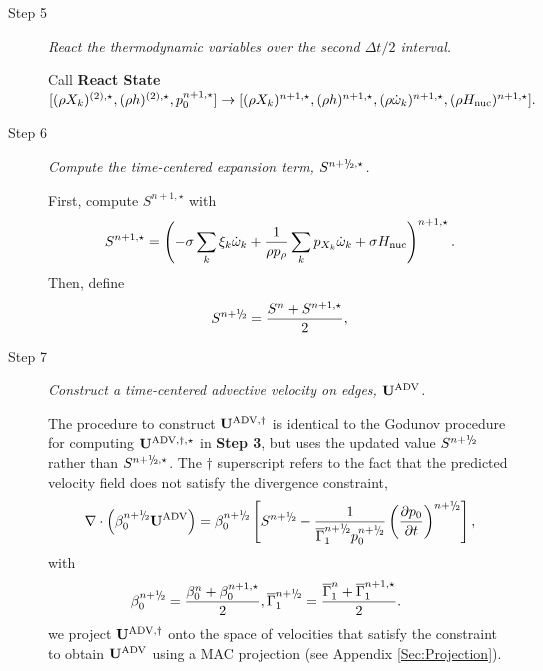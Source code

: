 \begin{description}
\item[Step 5] {\em React the thermodynamic variables over the second $\Delta t / 2$ interval.}

Call {\bf React State}$[ (\rho X_k)^{(2),\star}, (\rho h)^{(2),\star}, p_0^{n+1,\star}] 
\rightarrow 
[ (\rho X_k)^{n+1,\star}, (\rho h)^{n+1,\star}, (\rho \dot\omega_k)^{n+1,\star}, (\rho H_{\rm nuc})^{n+1,\star} ].$

\item[Step 6] {\em Compute the time-centered expansion term, $S^{\nph,\star}$.}

First, compute $S^{n+1,\star}$ with
\begin{equation}
S^{n+1,\star} =  \left(-\sigma  \sum_k  \xi_k  \omegadot_k  + \frac{1}{\rho p_\rho} \sum_k p_{X_k}  {\omegadot}_k + \sigma \Hnuc\right)^{n+1,\star}.
\end{equation}
  Then, define
\begin{equation}
 S^{\nph} = \frac{S^n + S^{n+1,\star}}{2},
\end{equation}

\item[Step 7] {\em Construct a time-centered advective velocity on edges, ${\bf{U}}^{\mathrm{ADV}}$.}

The procedure to construct ${\bf{U}}^{\mathrm{ADV},\dagger}$ is identical to the Godunov procedure
for computing ${\bf{U}}^{\mathrm{ADV},\dagger,\star}$ in {\bf Step 3}, but uses
the updated value $S^{\nph}$ rather than $S^{\nph,\star}$.
The $\dagger$ superscript refers to the fact that the predicted velocity field does not satisfy the divergence constraint,
\begin{equation}
\nabla \cdot \left(\beta_0^{\nph} \uadvtwo\right) =
\beta_0^{\nph} \left[S^{\nph} - \frac{1}{\gammaonebar^{\nph}p_0^{\nph}}\left(\frac{\partial p_0}{\partial t}\right)^{\nph}\right],\label{eq:div2}
\end{equation}
with
\begin{equation}
\beta_0^{\nph} = \frac{ \beta_0^n +  \beta_0^{n+1,\star} }{2},
\gammaonebar^{\nph} = \frac{ \gammaonebar^n +  \gammaonebar^{n+1,\star} }{2}.
\qquad
\end{equation}
we project ${\bf{U}}^{\mathrm{ADV},\dagger}$ onto the space of velocities that satisfy the constraint to obtain ${\bf{U}}^{\mathrm{ADV}}$ using a MAC projection (see Appendix \ref{Sec:Projection}).


\end{description}
